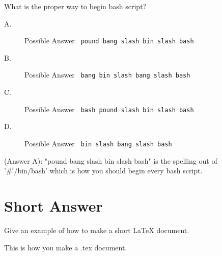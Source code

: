 \documentclass[12pt,answers]{exam}
\begin{document}
\begin{questions}
\question What is the proper way to begin bash script?
\begin{description}
\item[A.] Possible Answer \verb' pound bang slash bin slash bash'
\item[B.] Possible Answer \verb' bang bin slash bang slash bash'
\item[C.] Possible Answer \verb' bash pound slash bin slash bash'   
\item[D.] Possible Answer \verb' bin slash bang slash bash'     
\end{description}
\begin{solution}
(Answer A): "pound bang slash bin slash bash" is the spelling out of '#!/bin/bash' which is how you should begin every bash script.  
\end{solution}

\end{questions}
\section*{Short Answer}
Give an example of how to make a short LaTeX document. 
\begin{solution}


This is how you make a .tex document.


\end{solution}
\end{document}
